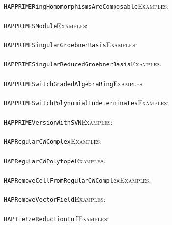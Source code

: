 \documentclass[a4paper,11pt]{report}
\begin{document}
{{ \\
 \texttt{HAPPRIME{\textunderscore}RingHomomorphismsAreComposable}{\nobreakspace}{\nobreakspace}{\nobreakspace}{\nobreakspace}\textsc{Examples:} \\
 \\
 \texttt{HAPPRIME{\textunderscore}SModule}{\nobreakspace}{\nobreakspace}{\nobreakspace}{\nobreakspace}\textsc{Examples:} \\
 \\
 \texttt{HAPPRIME{\textunderscore}SingularGroebnerBasis}{\nobreakspace}{\nobreakspace}{\nobreakspace}{\nobreakspace}\textsc{Examples:} \\
 \\
 \texttt{HAPPRIME{\textunderscore}SingularReducedGroebnerBasis}{\nobreakspace}{\nobreakspace}{\nobreakspace}{\nobreakspace}\textsc{Examples:} \\
 \\
 \texttt{HAPPRIME{\textunderscore}SwitchGradedAlgebraRing}{\nobreakspace}{\nobreakspace}{\nobreakspace}{\nobreakspace}\textsc{Examples:} \\
 \\
 \texttt{HAPPRIME{\textunderscore}SwitchPolynomialIndeterminates}{\nobreakspace}{\nobreakspace}{\nobreakspace}{\nobreakspace}\textsc{Examples:} \\
 \\
 \texttt{HAPPRIME{\textunderscore}VersionWithSVN}{\nobreakspace}{\nobreakspace}{\nobreakspace}{\nobreakspace}\textsc{Examples:} \\
 \\
 \texttt{HAPRegularCWComplex}{\nobreakspace}{\nobreakspace}{\nobreakspace}{\nobreakspace}\textsc{Examples:} \\
 \\
 \texttt{HAPRegularCWPolytope}{\nobreakspace}{\nobreakspace}{\nobreakspace}{\nobreakspace}\textsc{Examples:} \\
 \\
 \texttt{HAPRemoveCellFromRegularCWComplex}{\nobreakspace}{\nobreakspace}{\nobreakspace}{\nobreakspace}\textsc{Examples:} \\
 \\
 \texttt{HAPRemoveVectorField}{\nobreakspace}{\nobreakspace}{\nobreakspace}{\nobreakspace}\textsc{Examples:} \\
 \\
 \texttt{HAPTietzeReduction{\textunderscore}Inf}{\nobreakspace}{\nobreakspace}{\nobreakspace}{\nobreakspace}\textsc{Examples:} \\
 \\
}}
\end{document}

